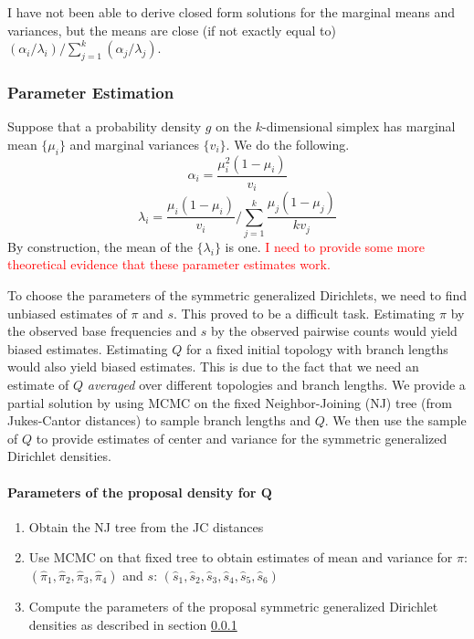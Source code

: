 \documentclass[useAMS,usenatbib]{biom}
\newcommand{\falta}[1]{\textcolor{red}{#1}}
\begin{document}
I have not been able to derive closed form solutions for the marginal
means and variances, but the means are close (if not exactly equal to)
$(\alpha_i/\lambda_i) \big/ \sum_{j=1}^k (\alpha_j/\lambda_j)$.

\subsubsection{Parameter Estimation}
\label{paramEst}
Suppose that a probability density $g$ on the $k$-dimensional simplex
has marginal mean $\{\mu_i\}$ and marginal variances $\{v_i\}$.  We do
the following.
$$
\alpha_i = \frac{\mu_i^2(1-\mu_i)}{v_i}
$$
$$
\lambda_i = \frac{\mu_i(1-\mu_i)}{v_i} \Bigg/ \sum_{j=1}^k \frac{\mu_j(1-\mu_j)}{kv_j}
$$
By construction, the mean of the $\{\lambda_i\}$ is one.  \falta{I
  need to provide some more theoretical evidence that these parameter
  estimates work.}


To choose the parameters of the symmetric generalized Dirichlets, we
need to find unbiased estimates of $\pi$ and $s$. This proved to be a
difficult task. Estimating $\pi$ by the observed base frequencies and
$s$ by the observed pairwise counts would yield biased
estimates. Estimating $Q$ for a fixed initial topology with branch
lengths would also yield biased estimates. This is due to the fact
that we need an estimate of $Q$ \textit{averaged} over different
topologies and branch lengths.  We provide a partial solution by using
MCMC on the fixed Neighbor-Joining (NJ) tree (from Jukes-Cantor
distances) to sample branch lengths and $Q$. We then use the sample of
$Q$ to provide estimates of center and variance for the symmetric
generalized Dirichlet densities.

\paragraph{Parameters of the proposal density for $\mathbf{Q}$}
\begin{enumerate}
\item{Obtain the NJ tree from the JC distances}
\item{Use MCMC on that fixed tree to obtain estimates of mean and
    variance for $\pi$:
    $(\hat{\pi}_1,\hat{\pi}_2,\hat{\pi}_3,\hat{\pi}_4)$ and $s$:
    $(\hat{s}_1,\hat{s}_2,\hat{s}_3,\hat{s}_4,\hat{s}_5,\hat{s}_6)$}
\item{Compute the parameters of the proposal symmetric generalized
    Dirichlet densities as described in section \ref{paramEst}}
\end{enumerate}
\end{document}
